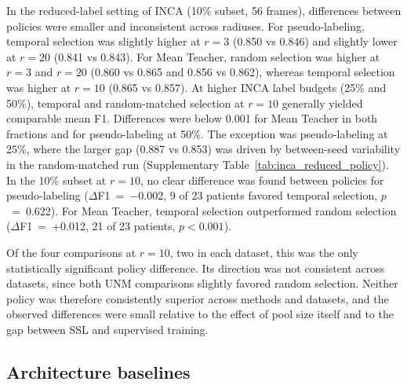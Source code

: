 \documentclass[a4paper,fleqn]{cas-dc}
\begin{document}
In the reduced-label setting of INCA (10\% subset, 56 frames), differences between policies were smaller and inconsistent across radiuses. For pseudo-labeling, temporal selection was slightly higher at $r{=}3$ (0.850 vs 0.846) and slightly lower at $r{=}20$ (0.841 vs 0.843). For Mean Teacher, random selection was higher at $r{=}3$ and $r{=}20$ (0.860 vs 0.865 and 0.856 vs 0.862), whereas temporal selection was higher at $r{=}10$ (0.865 vs 0.857).
At higher INCA label budgets (25\% and 50\%), temporal and random-matched selection at $r{=}10$ generally yielded comparable mean F1. Differences were below 0.001 for Mean Teacher in both fractions and for pseudo-labeling at 50\%. The exception was pseudo-labeling at 25\%, where the larger gap (0.887 vs 0.853) was driven by between-seed variability in the random-matched run (Supplementary Table~\ref{tab:inca_reduced_policy}).
In the 10\% subset at $r{=}10$, no clear difference was found between policies for pseudo-labeling ($\Delta$F1~=~$-$0.002, 9 of 23 patients favored temporal selection, $p$~=~0.622). For Mean Teacher, temporal selection outperformed random selection ($\Delta$F1~=~+0.012, 21 of 23 patients, $p<0.001$).

Of the four comparisons at $r{=}10$, two in each dataset, this was the only statistically significant policy difference. Its direction was not consistent across datasets, since both UNM comparisons slightly favored random selection. Neither policy was therefore consistently superior across methods and datasets, and the observed differences were small relative to the effect of pool size itself and to the gap between SSL and supervised training.

\subsection{Architecture baselines}
\end{document}

